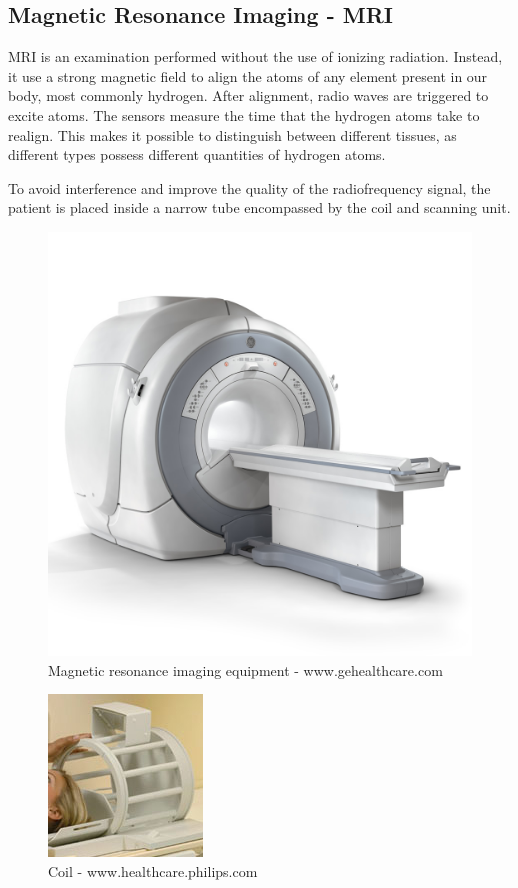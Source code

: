 \subsection{Magnetic Resonance Imaging - MRI}

MRI is an examination performed without the use of ionizing radiation. Instead, it use a strong magnetic field to align the atoms of any element present in our body, most commonly hydrogen. After alignment, radio waves are triggered to excite atoms. The sensors measure the time that the hydrogen atoms take to realign. This makes it possible to distinguish between different tissues, as different types possess different quantities of hydrogen atoms.

To avoid interference and improve the quality of the radiofrequency signal, the patient is placed inside a narrow tube encompassed by the coil and scanning unit.

\begin{figure}[!htb]
\centering
\includegraphics[scale=0.2]{../user_guide_figures/rm_ge.jpg}
\caption{Magnetic resonance imaging equipment - www.gehealthcare.com}
\end{figure}

\begin{figure}[!htb]
\centering
\includegraphics[scale=0.8]{../user_guide_figures/bobina.jpg}
\caption{Coil - www.healthcare.philips.com}
\end{figure}

